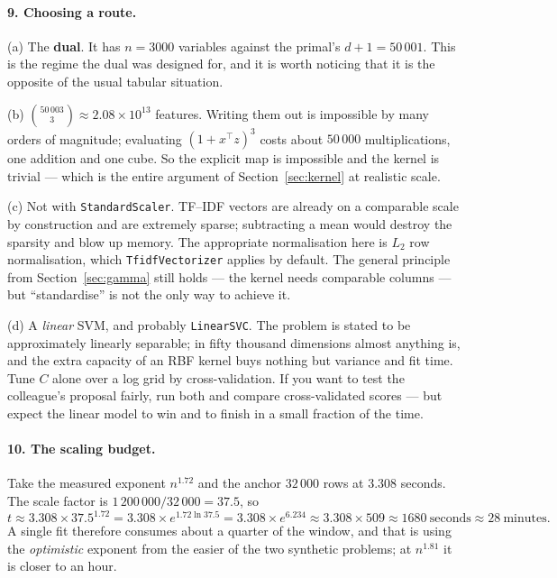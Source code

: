 \documentclass[11pt]{article}
\begin{document}
\paragraph{9. Choosing a route.}
(a) The \textbf{dual}. It has $n = 3000$ variables against the primal's
$d + 1 = 50\,001$. This is the regime the dual was designed for, and it is
worth noticing that it is the opposite of the usual tabular situation.

(b) $\binom{50\,003}{3} \approx 2.08\times10^{13}$ features. Writing them out
is impossible by many orders of magnitude; evaluating
$(1 + x^\top z)^3$ costs about $50\,000$ multiplications, one addition and one
cube. So the explicit map is impossible and the kernel is trivial --- which is
the entire argument of Section~\ref{sec:kernel} at realistic scale.

(c) Not with \texttt{StandardScaler}. TF--IDF vectors are already on a
comparable scale by construction and are extremely sparse; subtracting a mean
would destroy the sparsity and blow up memory. The appropriate normalisation
here is $L_2$ row normalisation, which \texttt{TfidfVectorizer} applies by
default. The general principle from Section~\ref{sec:gamma} still holds --- the
kernel needs comparable columns --- but ``standardise'' is not the only way to
achieve it.

(d) A \emph{linear} SVM, and probably \texttt{LinearSVC}. The problem is stated
to be approximately linearly separable; in fifty thousand dimensions almost
anything is, and the extra capacity of an RBF kernel buys nothing but variance
and fit time. Tune $C$ alone over a log grid by cross-validation. If you want
to test the colleague's proposal fairly, run both and compare cross-validated
scores --- but expect the linear model to win and to finish in a small fraction
of the time.

\paragraph{10. The scaling budget.}
Take the measured exponent $n^{1.72}$ and the anchor $32\,000$ rows at
$3.308$ seconds. The scale factor is $1\,200\,000 / 32\,000 = 37.5$, so
\[
  t \approx 3.308 \times 37.5^{1.72}
    = 3.308 \times e^{1.72 \ln 37.5}
    = 3.308 \times e^{6.234}
    \approx 3.308 \times 509
    \approx 1680\ \text{seconds}
    \approx 28\ \text{minutes}.
\]
A single fit therefore consumes about a quarter of the window, and that is
using the \emph{optimistic} exponent from the easier of the two synthetic
problems; at $n^{1.81}$ it is closer to an hour.
\end{document}
